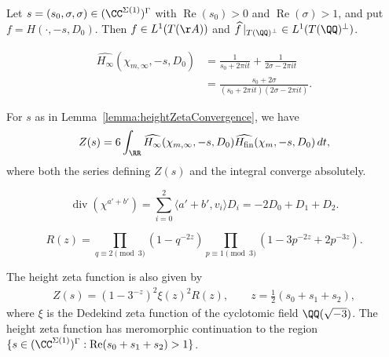\begin{lemma}\label{lemma:heightZetaConvergence} Let $s=(s_0,\sigma,\sigma)\in(\CC^{\Sigma(1)})^\Gamma$ with $\operatorname{Re}(s_0)>0$ and $\operatorname{Re}(\sigma)>1$, and put $f=H(\cdot,-s,D_0)$. Then $f\in L^1(T(\AA))$ and $\widehat f\,|_{T(\QQ)^\perp}\in L^1(T(\QQ)^\perp)$. \end{lemma}

\begin{equation}\label{eqn:archimedeanSpectralFactor} \begin{aligned} \widehat{H_\infty}(\chi_{m,\infty},-s,D_0) &=\frac1{s_0+2\pi it}+\frac1{2\sigma-2\pi it}\\ &=\frac{s_0+2\sigma} {(s_0+2\pi it)(2\sigma-2\pi it)}. \end{aligned} \end{equation}

\begin{lemma}\label{lemma:poissonIntegral} For $s$ as in Lemma~\ref{lemma:heightZetaConvergence}, we have \begin{equation}\label{eqn:poissonEulerIntegral} Z(s)=6\int_\RR \widehat{H_\infty}(\chi_{m,\infty},-s,D_0) \widehat{H_{\mathrm{fin}}}(\chi_m,-s,D_0)\,dt, \end{equation} where both the series defining $Z(s)$ and the integral converge absolutely. \end{lemma}

\begin{equation}\label{eqn:normCharacterDivisor} \operatorname{div}(\chi^{a'+b'}) =\sum_{i=0}^2\langle a'+b',v_i\rangle D_i =-2D_0+D_1+D_2. \end{equation}

\begin{equation}\label{eqn:eulerCorrectionFactor} R(z)=\prod_{q\equiv2\pmod3}\left(1-q^{-2z}\right) \prod_{p\equiv1\pmod3}\left(1-3p^{-2z}+2p^{-3z}\right). \end{equation}

\begin{lemma}\label{lemma:simplifiedZ(s)} The height zeta function is also given by \begin{align} Z(s)=\left(1-3^{-z}\right)^2\xi(z)^2R(z),\qquad z=\tfrac12(s_0+s_1+s_2), \end{align} where $\xi$ is the Dedekind zeta function of the cyclotomic field $\QQ(\sqrt{-3})$. The height zeta function has meromorphic continuation to the region $\{s \in (\CC^{\Sigma(1)})^{\Gamma} : \mathrm{Re}(s_0+s_1+s_2) > 1\}$. \end{lemma}

